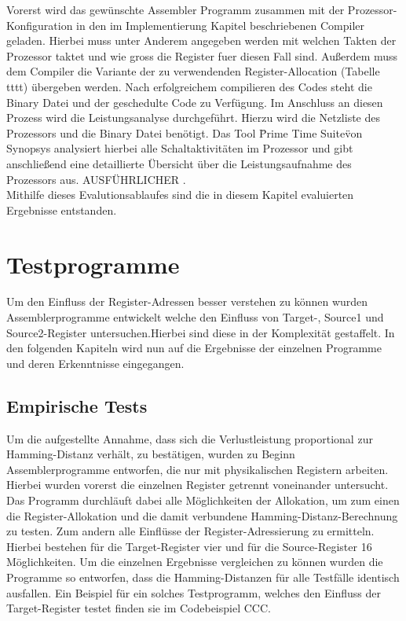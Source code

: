 Vorerst wird das gewünschte Assembler Programm zusammen mit der Prozessor-Konfiguration in den im Implementierung Kapitel beschriebenen Compiler geladen. Hierbei muss unter Anderem angegeben werden mit welchen Takten der Prozessor taktet und wie gross die Register fuer diesen Fall sind. Außerdem muss dem Compiler die Variante der zu verwendenden Register-Allocation (Tabelle tttt) übergeben werden. Nach erfolgreichem compilieren des Codes steht die Binary Datei und der geschedulte Code zu Verfügung. Im Anschluss an diesen Prozess wird die Leistungsanalyse durchgeführt. Hierzu wird die Netzliste des Prozessors und die Binary Datei benötigt. Das Tool \"Prime Time Suite\" von Synopsys analysiert hierbei alle Schaltaktivitäten im Prozessor und gibt anschließend eine detaillierte Übersicht über die Leistungsaufnahme des Prozessors aus. AUSFÜHRLICHER .\\ 
Mithilfe dieses Evalutionsablaufes sind die in diesem Kapitel evaluierten Ergebnisse entstanden.
\section{Testprogramme}
Um den Einfluss der Register-Adressen besser verstehen zu können wurden Assemblerprogramme entwickelt welche den Einfluss von Target-, Source1 und Source2-Register untersuchen.Hierbei sind diese in der Komplexität gestaffelt. In den folgenden Kapiteln wird nun auf die Ergebnisse der einzelnen Programme und deren Erkenntnisse eingegangen.
\subsection{Empirische Tests}
\label{cap:empirischeTests}
Um die aufgestellte Annahme, dass sich die Verlustleistung proportional zur Hamming-Distanz verhält, zu bestätigen, wurden zu Beginn Assemblerprogramme entworfen, die nur mit physikalischen Registern arbeiten. Hierbei  wurden vorerst die einzelnen Register getrennt voneinander untersucht. Das Programm durchläuft dabei alle Möglichkeiten der Allokation, um zum einen die Register-Allokation und die damit verbundene Hamming-Distanz-Berechnung zu testen. Zum andern alle Einflüsse der Register-Adressierung zu ermitteln. Hierbei bestehen für die Target-Register vier und für die Source-Register 16 Möglichkeiten. Um die einzelnen Ergebnisse vergleichen zu können wurden die Programme so entworfen, dass die Hamming-Distanzen für alle Testfälle identisch ausfallen. Ein Beispiel für ein solches Testprogramm, welches den Einfluss der Target-Register testet finden sie im Codebeispiel CCC.

